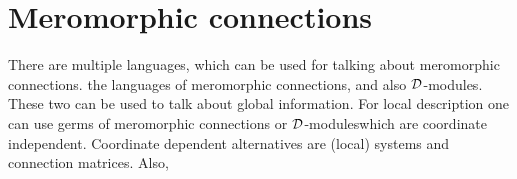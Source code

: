 \chapter{Meromorphic connections}
\begin{comment}
  \begin{multicols}{2}
    \textbf{Global}
    \begin{itemize}
      \item Meromorphic connection
      \item $\cD$-modules (global)
    \end{itemize}
    \columnbreak
    \textbf{Local}
    \begin{itemize}
      \item Germ of a meromorphic connection
      \item $\cD$-modules (local)
      \item System
        \begin{itemize}
          \item coordinate dependent
        \end{itemize}
      \item Conection matrix
        \begin{itemize}
          \item coordinate dependent
        \end{itemize}
    \end{itemize}
  \end{multicols}
\end{comment}
There are multiple languages, which can be used for talking about meromorphic
connections.  the languages of meromorphic connections, and also
$\mathcal{D}$-modules\TODO[global].
These two can be used to talk about global information.
For local description one can use germs of meromorphic connections or
$\mathcal{D}$-modules\TODO[local] which are coordinate independent. Coordinate
dependent alternatives are (local) systems and connection matrices. Also,

\begin{comment}
  Siehe:
  \begin{multicols}{3}
    \begin{itemize}
      \item \cite{boalch} and \cite{thboalch}
      \item \cite{sabbah2007isomonodromic}
      \item \cite{Varadarajan96linearmeromorphic}
      \item \textbf{\cite[Chap.5]{hotta2008}}
    \end{itemize}
    \columnbreak
    Differential modules:
    \begin{itemize}
      \item \cite{Loday1994}
      \item \cite{Loday2014}
    \end{itemize}
  \end{multicols}
\end{comment}

